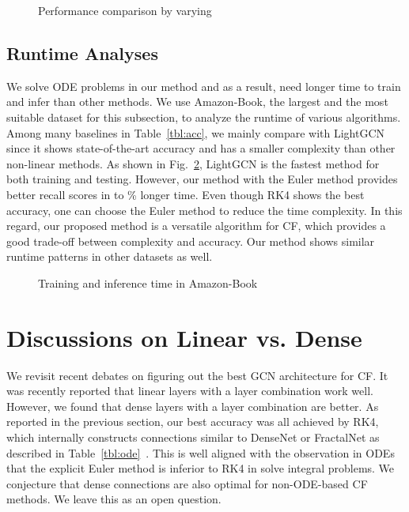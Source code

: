 \documentclass[sigconf]{acmart}
\begin{document}
\begin{figure}[t]
\centering
{}
\caption{Performance comparison by varying } \label{fig:knum}
\end{figure}





\subsection{Runtime Analyses}


We solve ODE problems in our method and as a result, need longer time to train and infer than other methods. We use Amazon-Book, the largest and the most suitable dataset for this subsection, to analyze the runtime of various algorithms. Among many baselines in Table~\ref{tbl:acc}, we mainly compare with LightGCN since it shows state-of-the-art accuracy and has a smaller complexity than other non-linear methods. As shown in Fig.~\ref{fig:runtime}, LightGCN is the fastest method for both training and testing. However, our method with the Euler method provides better recall scores in  to \% longer time. Even though RK4 shows the best accuracy, one can choose the Euler method to reduce the time complexity. In this regard, our proposed method is a versatile algorithm for CF, which provides a good trade-off between complexity and accuracy. Our method shows similar runtime patterns in other datasets as well. 

\begin{figure}[t]
\centering
{}

\caption{Training and inference time in Amazon-Book} \label{fig:runtime}
\end{figure}

\section{Discussions on Linear vs. Dense}\label{sec:dis}
We revisit recent debates on figuring out the best GCN architecture for CF. It was recently reported that linear layers with a layer combination work well. However, we found that dense layers with a layer combination are better. As reported in the previous section, our best accuracy was all achieved by RK4, which internally constructs connections similar to DenseNet or FractalNet as described in Table~\ref{tbl:ode}~\cite{zhu2019convolutional,Larsson2017FractalNetUN,pmlr-v80-lu18d}. This is well aligned with the observation in ODEs that the explicit Euler method is inferior to RK4 in solve integral problems. We conjecture that dense connections are also optimal for non-ODE-based CF methods. We leave this as an open question.
\end{document}
